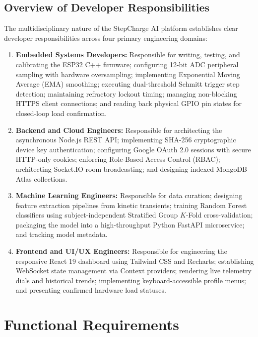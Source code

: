 \subsection{Overview of Developer Responsibilities}
The multidisciplinary nature of the StepCharge AI platform establishes clear developer responsibilities across four primary engineering domains:
\begin{enumerate}
    \item \textbf{Embedded Systems Developers:} Responsible for writing, testing, and calibrating the ESP32 C++ firmware; configuring 12-bit ADC peripheral sampling with hardware oversampling; implementing Exponential Moving Average (EMA) smoothing; executing dual-threshold Schmitt trigger step detection; maintaining refractory lockout timing; managing non-blocking HTTPS client connections; and reading back physical GPIO pin states for closed-loop load confirmation.
    \item \textbf{Backend and Cloud Engineers:} Responsible for architecting the asynchronous Node.js REST API; implementing SHA-256 cryptographic device key authentication; configuring Google OAuth 2.0 sessions with secure HTTP-only cookies; enforcing Role-Based Access Control (RBAC); architecting Socket.IO room broadcasting; and designing indexed MongoDB Atlas collections.
    \item \textbf{Machine Learning Engineers:} Responsible for data curation; designing feature extraction pipelines from kinetic transients; training Random Forest classifiers using subject-independent Stratified Group $K$-Fold cross-validation; packaging the model into a high-throughput Python FastAPI microservice; and tracking model metadata.
    \item \textbf{Frontend and UI/UX Engineers:} Responsible for engineering the responsive React 19 dashboard using Tailwind CSS and Recharts; establishing WebSocket state management via Context providers; rendering live telemetry dials and historical trends; implementing keyboard-accessible profile menus; and presenting confirmed hardware load statuses.
\end{enumerate}

\section{Functional Requirements}


